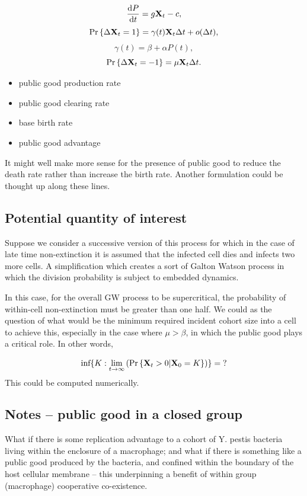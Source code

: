 $$\displaystyle\frac{{\rm d} P}{{\rm d} t} = g {{\bf X}_t} - c,$$
$${\text{Pr}\left\{\Delta {{\bf X}_t} = 1\right\}} = \gamma(t){{\bf X}_t}\Delta t + o(\Delta t),$$
$$\gamma(t) = \beta + \alpha P(t),$$
$${\text{Pr}\left\{\Delta {{\bf X}_t} = -1\right\}} = \mu {{\bf X}_t} \Delta t.$$

\begin{itemize}
\item[$g$:] public good production rate
\item[$c$:] public good clearing rate
\item[$\beta$:] base birth rate
\item[$\alpha$:] public good advantage
\end{itemize}
It might well make more sense for the presence of public good to reduce the death rate rather than increase the birth rate.  Another formulation could be thought up along these lines. \par 

\subsection*{Potential quantity of interest}

Suppose we consider a successive version of this process for which in the case of late time non-extinction it is assumed that the infected cell dies and infects two more cells.  A simplification which creates a sort of Galton Watson process in which the division probability is subject to embedded dynamics.\par 
In this case,  for the overall GW process to be supercritical,  the probability of within-cell non-extinction must be greater than one half.  We could as the question of what would be the minimum required incident cohort size into a cell to achieve this,  especially in the case where $\mu > \beta$, in which the public good plays a critical role.  In other words, 

$$\text{inf}\{K : \lim_{t\to\infty}\left({\text{Pr}\left\{{{\bf X}_t} > 0 | {\bf X}_0 = K \right\}}\right)\} = \text{?}$$
This could be computed numerically. 


\subsection*{Notes -- public good in a closed group}

What if there is some replication advantage to a cohort of Y. pestis bacteria living within the enclosure of a macrophage; and what if there is something like a public good produced by the bacteria, and confined within the boundary of the host cellular membrane -- this underpinning a benefit of within group (macrophage) cooperative co-existence. \par 

